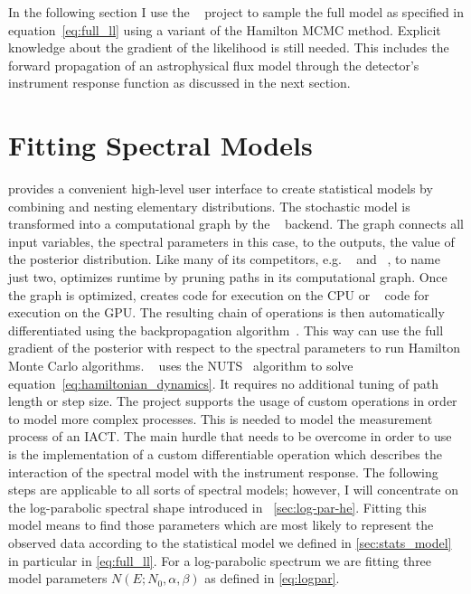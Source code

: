 In the following section I use the \pymc~\cite{pymc} project to sample the full model as specified in equation~\ref{eq:full_ll} using a variant of the Hamilton MCMC method.
Explicit knowledge about the gradient of the likelihood is still needed. This includes the forward propagation 
of an astrophysical flux model through the detector's instrument response function as discussed in the next section. 

\section{Fitting Spectral Models}
\label{sec:spectral_fit}

\pymc provides a convenient high-level user interface to create statistical models by combining and nesting elementary distributions. 
The stochastic model is transformed into a computational graph by the \theano~\cite{theano} backend.
The graph connects all input variables, the spectral parameters in this case, to the outputs, the value of the posterior distribution. 
Like many of its competitors, e.g. \pytorch~\cite{torch} and \tensorflow~\cite{tensorflow}, to name just two, \theano optimizes runtime 
by pruning paths in its computational graph.
Once the graph is optimized, \theano creates \cpp code for execution on the CPU or \cuda~\cite{cuda} code for 
execution on the GPU. 
The resulting chain of operations is then automatically differentiated using the backpropagation algorithm~\cite{backprop,ad_survey}. 
This way \pymc can use the full gradient of the posterior with respect to the spectral parameters to run Hamilton Monte Carlo algorithms.
\pymc~\cite{pymc} uses the NUTS~\cite{nuts} algorithm to solve equation~\ref{eq:hamiltonian_dynamics}. It requires no additional tuning of 
path length or step size. The \pymc project supports the usage of custom operations in order to model more complex processes. This is needed to 
model the measurement process of an IACT.
The main hurdle that needs to be overcome in order to use \pymc is the implementation of a custom differentiable \theano operation 
which describes the interaction of the spectral model with the instrument response.
The following steps are applicable to all sorts of spectral models; however, I will concentrate on the log-parabolic spectral shape 
introduced in ~\cref{sec:log-par-he}.
Fitting this model means to find those parameters which are most likely to represent the observed
data according to the statistical model we defined in \cref{sec:stats_model} in particular in \cref{eq:full_ll}.
For a log-parabolic spectrum we are fitting three model parameters $N(E; N_0, \alpha, \beta)$ as defined in \cref{eq:logpar}. 

